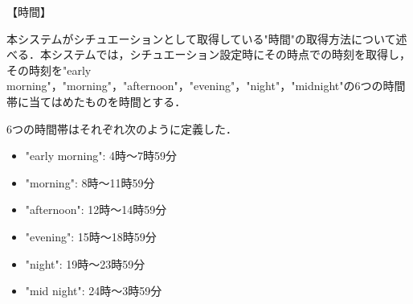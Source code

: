 【時間】
\par 本システムがシチュエーションとして取得している"時間"の取得方法について述べる．本システムでは，シチュエーション設定時にその時点での時刻を取得し，その時刻を"early morning"，"morning"，"afternoon"，"evening"，"night"，"midnight"の6つの時間帯に当てはめたものを時間とする．
\par 6つの時間帯はそれぞれ次のように定義した．
\begin{itemize}
 \item "early morning": 4時～7時59分
 \item "morning": 8時～11時59分
 \item "afternoon": 12時～14時59分
 \item "evening": 15時～18時59分
 \item "night": 19時～23時59分
 \item "mid night": 24時～3時59分
\end{itemize}
